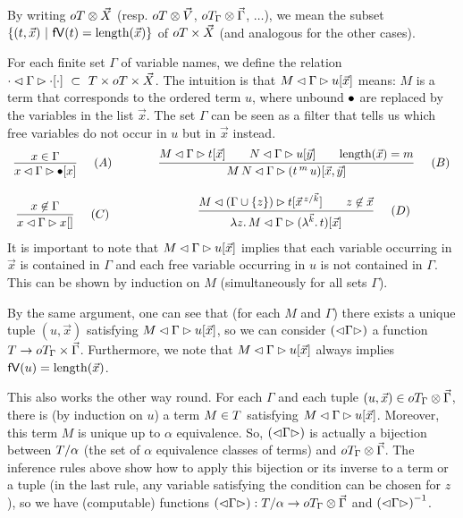 \documentclass[submission,copyright,creativecommons]{eptcs}
\begin{document}
By writing $oT \otimes \vec {X}$ (resp. $oT \otimes \vec {V}$, $oT_\Gamma \otimes \vec \Gamma$, $\ldots$), we mean the subset $\{(t, \vec x) \ | \ \freevars t = \length {\vec x} \}$ of $oT \times \vec {X}$ (and analogous for the other cases).

For each finite %
set $\Gamma$ of variable names, we define the relation
${\cdot \lhd \Gamma \rhd \cdot[\cdot]} ~ \subset ~ T \times oT \times \vec {X}$.
The intuition is that ${M \lhd \Gamma \rhd u[\vec x]}$ means: 
$M$ is a term that corresponds to the ordered term $u$, where unbound $\mathord{\bullet}$ are replaced by the variables in the list $\vec x$. 
The set $\Gamma$ can be seen as a filter that tells us which free variables do not occur in $u$ but in $\vec x$ instead.
\[
\begin{array}{c@{\qquad\qquad} c}
\infnamed{\quad (A)}{x \in \Gamma}{\parseb x \Gamma \ovar x}
&
\infnamed{\quad (B)}{ {\parseb M \Gamma t {\vec x}} \qquad 
        {\parseb N \Gamma u {\vec y}} \qquad {\length{\vec x} = m} } 
      {\parseb {M\,N} {\Gamma} {(\ApO t m u)}  {\vec x, \vec y} } 
\\ \\
\infnamed{\quad (C)}{x \not\in \Gamma}{\parseb x \Gamma x {}}
&
\infnamed{\quad (D)}{ 
         {\parseb M { (\Gamma \cup \{z\}) }  t {\multiinsert{\vec x}{\vec k}{z}   }} 
          \qquad 
          z \not\in \vec x  }
          {\parseb {\LaA z M} {\Gamma} {(\LaO {\vec{k}} t)} {\vec x}}
\end{array}
\]
It is important to note that ${M \lhd \Gamma \rhd u[\vec x]}$ implies that each variable occurring in $\vec x$ is contained in $\Gamma$ and each free variable occurring in $u$ is not contained in $\Gamma$. This can be shown by induction on $M$ (simultaneously for all sets $\Gamma$). 

By the same argument, one can see that (for each $M$ and $\Gamma$) there exists a unique tuple $(u, \vec x)$ satisfying ${M \lhd \Gamma \rhd u[\vec x]}$, so we can consider ${\left(\mathord{\lhd} {\Gamma} \mathord{\rhd}\right)}$ a function $T \rightarrow oT_\Gamma \times \vec \Gamma$. Furthermore, we note that ${M \lhd \Gamma \rhd u[\vec x]}$ always implies $\mathsf{fV}(u) = \mbox{length}(\vec x)$. 
 
This also works the other way round. For each $\Gamma$ and each tuple $(u, \vec x) \in oT_\Gamma \otimes \vec \Gamma$, there is (by induction on $u$) a term $M \in T$ satisfying ${M \lhd \Gamma \rhd u[\vec x]}$. Moreover, this term $M$ is unique up to $\alpha$ equivalence. So, ${\left(\mathord{\lhd} {\Gamma} \mathord{\rhd}\right)}$ is actually a bijection between $T / \alpha$ (the set of $\alpha$ equivalence classes of terms) and $oT_\Gamma \otimes \vec \Gamma$. The inference rules above show how to apply this bijection or its inverse to a term or a tuple (in the last rule, any variable satisfying the condition can be chosen for $z$), so we have (computable) functions ${\left(\mathord{\lhd} {\Gamma} \mathord{\rhd}\right)} : T / \alpha \rightarrow oT_\Gamma \otimes \vec \Gamma$ and ${\left(\mathord{\lhd} {\Gamma} \mathord{\rhd}\right)} ^{-1}$. 
\end{document}
